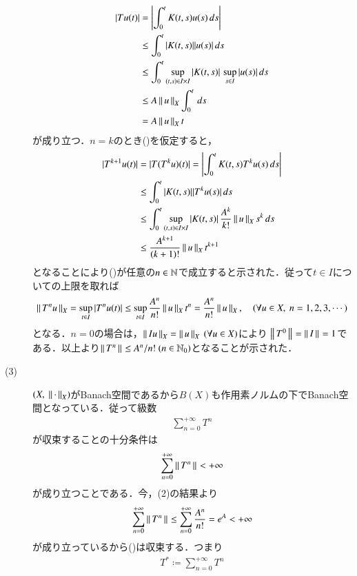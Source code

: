 \begin{prf}
\begin{description}
\begin{align}
			|Tu(t)| &= \left|\int_{0}^{t} K(t,s)u(s)\, ds\right| \\
			&\leq \int_{0}^{t} |K(t,s)||u(s)|\, ds \\
			&\leq \int_{0}^{t} \operatorname*{sup}_{(t,s)\in I \times I} |K(t,s)|\, \operatorname*{sup}_{s \in I} |u(s)|\, ds \\
			&\leq A\left\|\, u\, \right\|_{X} \int_{0}^{t}\, ds \\
			&= A\left\|\, u\, \right\|_{X}t
		\end{align}
		が成り立つ．$n=k$のとき()を仮定すると，
		\begin{align}
			|T^{k+1}u(t)| &= |T(T^ku)(t)| = \left|\int_{0}^{t} K(t,s)T^ku(s)\, ds\right| \\
			&\leq \int_{0}^{t} |K(t,s)||T^ku(s)|\, ds \\
			&\leq \int_{0}^{t} \operatorname*{sup}_{(t,s)\in I \times I} |K(t,s)|\, \frac{A^k}{k!}\left\|\, u\, \right\|_{X}s^k\, ds \\
			&\leq \frac{A^{k+1}}{(k+1)!}\left\|\, u\, \right\|_{X}t^{k+1}
		\end{align}
		となることにより()が任意の$n \in \mathbb{N}$で成立すると示された．従って$t \in I$についての上限を取れば
		\begin{align}
			\left\|\, T^nu\, \right\|_{X} = \operatorname*{sup}_{t \in I} |T^nu(t)| \leq \operatorname*{sup}_{t \in I} \frac{A^n}{n!}\left\|\, u\, \right\|_{X}t^n = \frac{A^n}{n!}\left\|\, u\, \right\|_{X}, 
			\quad (\forall u \in X,\ n = 1,2,3,\cdots)
		\end{align}
		となる．$n=0$の場合は，$\left\|\, Iu\, \right\|_{X} = \left\|\, u\, \right\|_{X}\ (\forall u \in X)$により
		$\left\|\, T^0\, \right\|_{} = \left\|\, I\, \right\|_{} = 1$である．以上より$\left\|\, T^n\, \right\|_{} \leq A^n/n!\ (n \in \mathbb{N}_0)$となることが示された．
	\item[(3)] $(X,\ \Norm{\cdot}{X})$がBanach空間であるから$B(X)$も作用素ノルムの下でBanach空間となっている．従って級数
		\begin{align}
			\sum_{n=0}^{+\infty} T^n \label{eq:func_analy_series}
		\end{align}
		が収束することの十分条件は
		\begin{align}
			\sum_{n=0}^{+\infty} \left\|\, T^n\, \right\|_{} < +\infty
		\end{align}
		が成り立つことである．今，(2)の結果より
		\begin{align}
			\sum_{n=0}^{+\infty} \left\|\, T^n\, \right\|_{} \leq \sum_{n=0}^{+\infty} \frac{A^n}{n!} = e^{A} < +\infty
		\end{align}
		が成り立っているから()は収束する．つまり
		\begin{align}
			T^* \coloneqq \sum_{n=0}^{+\infty} T^n
		\end{align}

\end{description}
\end{prf}
